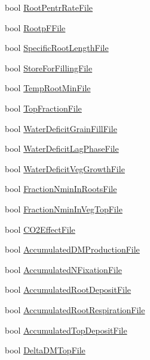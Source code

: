 \begin{DoxyCompactItemize}
\item 
bool \hyperlink{classcrop_parameters_crop_afde9b11e68c0774dcde915043cebf6cd}{RootPentrRateFile}
\item 
bool \hyperlink{classcrop_parameters_crop_ad4193c453f420c96f338c8c960e7a509}{RootpFFile}
\item 
bool \hyperlink{classcrop_parameters_crop_a36d1545a729b5a13eedd92f9226c283b}{SpecificRootLengthFile}
\item 
bool \hyperlink{classcrop_parameters_crop_aea0b5490ad52d46398835b92a685c102}{StoreForFillingFile}
\item 
bool \hyperlink{classcrop_parameters_crop_a81ef6d54910251c0d9be08f380dd94b3}{TempRootMinFile}
\item 
bool \hyperlink{classcrop_parameters_crop_ad8abc1e95a0b06ecbe346e6872c434c8}{TopFractionFile}
\item 
bool \hyperlink{classcrop_parameters_crop_a8f8a96cc6bd4193e1f3356adcf7b5482}{WaterDeficitGrainFillFile}
\item 
bool \hyperlink{classcrop_parameters_crop_a0bfbf6c9e3039819ad882a54c3c4b0eb}{WaterDeficitLagPhaseFile}
\item 
bool \hyperlink{classcrop_parameters_crop_ac8fc2d824f7d3a7a07349e056d576a93}{WaterDeficitVegGrowthFile}
\item 
bool \hyperlink{classcrop_parameters_crop_a0ac51345e65cef2114e6c37f41f8b35b}{FractionNminInRootsFile}
\item 
bool \hyperlink{classcrop_parameters_crop_a64f7a1baa3756813dea16e20f307b1be}{FractionNminInVegTopFile}
\item 
bool \hyperlink{classcrop_parameters_crop_ae154666f0510c4d1f7a5b47030b5b734}{CO2EffectFile}
\item 
bool \hyperlink{classcrop_parameters_crop_a8e30c458b22ecf00425769707fb7bb44}{AccumulatedDMProductionFile}
\item 
bool \hyperlink{classcrop_parameters_crop_a78b8a2f2e86d78d22706afc91626aa17}{AccumulatedNFixationFile}
\item 
bool \hyperlink{classcrop_parameters_crop_a42c251d7ff3c23c5f813f470dbd38c3d}{AccumulatedRootDepositFile}
\item 
bool \hyperlink{classcrop_parameters_crop_aead8ba23a94dc6a37d14715134819af1}{AccumulatedRootRespirationFile}
\item 
bool \hyperlink{classcrop_parameters_crop_a80124025f033eec62154f05f5db6e018}{AccumulatedTopDepositFile}
\item 
bool \hyperlink{classcrop_parameters_crop_ab1f3d6c752410829acef20a8295cebf1}{DeltaDMTopFile}

\end{DoxyCompactItemize}
